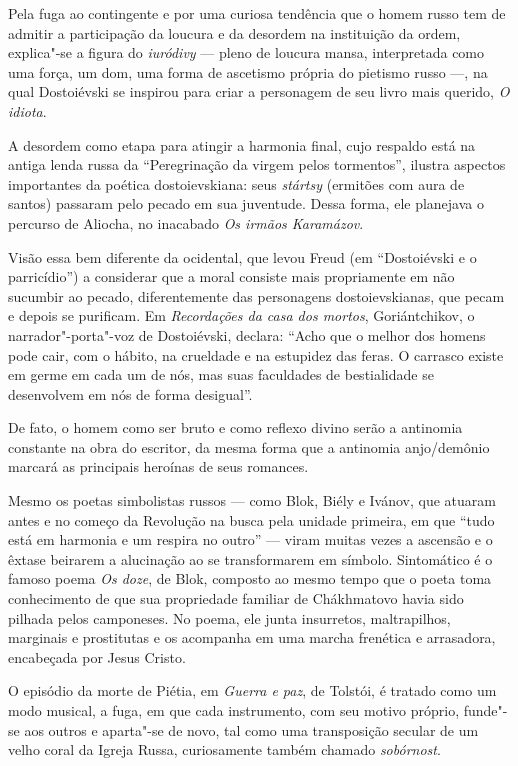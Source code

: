 Pela fuga ao contingente e por uma curiosa tendência que o homem russo
tem de admitir a participação da loucura e da desordem na instituição da
ordem, explica"-se a figura do \emph{iuródivy} --- pleno de loucura mansa,
interpretada como uma força, um dom, uma forma de ascetismo própria do
pietismo russo ---, na qual Dostoiévski se inspirou para criar a
personagem de seu livro mais querido, \emph{O idiota}.

A desordem como etapa para atingir a harmonia final, cujo respaldo está na antiga lenda russa da ``Peregrinação da virgem pelos tormentos'', ilustra aspectos importantes da poética dostoievskiana: seus \emph{stártsy} (ermitões com aura de santos) passaram pelo pecado em sua juventude. Dessa forma, ele planejava o percurso de Aliocha, no inacabado \emph{Os irmãos Karamázov}.

Visão essa bem diferente da ocidental, que levou Freud
(em ``Dostoiévski e o parricídio'') a considerar que a moral consiste
mais propriamente em não sucumbir ao pecado, diferentemente das
personagens dostoievskianas, que pecam e depois se purificam.
Em \emph{Recordações da casa dos mortos}, Goriántchikov, o
narrador"-porta"-voz de Dostoiévski, declara: ``Acho que o melhor dos
homens pode cair, com o hábito, na crueldade e na estupidez das feras. O carrasco existe em germe em cada um de nós, mas suas faculdades de bestialidade se desenvolvem em nós de forma desigual''.

De fato, o homem como ser bruto e como reflexo divino serão a antinomia constante na obra do escritor, da mesma forma que a antinomia anjo/demônio marcará as principais heroínas de seus romances.

Mesmo os poetas simbolistas russos --- como Blok, Biély e Ivánov, que atuaram antes e no começo da Revolução na busca pela unidade primeira, em que ``tudo está em harmonia e um respira no outro'' --- viram muitas vezes a ascensão e o êxtase beirarem a alucinação ao se transformarem em símbolo. Sintomático é o famoso poema \emph{Os doze}, de Blok, composto ao mesmo tempo que o poeta toma conhecimento de que sua propriedade familiar de Chákhmatovo havia sido pilhada pelos camponeses. No poema,
ele junta insurretos, maltrapilhos, marginais e prostitutas e os acompanha em uma marcha frenética e arrasadora, encabeçada por Jesus Cristo.

O episódio da morte de Piétia, em \emph{Guerra e paz}, de Tolstói, é tratado como um modo musical, a fuga, em que cada instrumento, com seu motivo próprio, funde"-se aos outros e aparta"-se de novo, tal como uma transposição secular de um velho coral da Igreja Russa, curiosamente também chamado \emph{sobórnost}.

